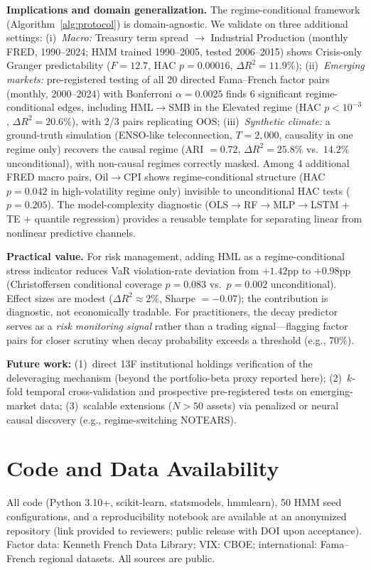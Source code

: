 \documentclass[sigconf,anonymous]{acmart}
\begin{document}
\textbf{Implications and domain generalization.}
The regime-conditional framework (Algorithm~\ref{alg:protocol}) is
domain-agnostic. We validate on three additional settings:
(i)~\emph{Macro:} Treasury term spread $\to$ Industrial Production
(monthly FRED, 1990--2024; HMM trained 1990--2005, tested 2006--2015)
shows Crisis-only Granger predictability
($F = 12.7$, HAC $p = 0.00016$, $\Delta R^2 = 11.9\%$);
(ii)~\emph{Emerging markets:} pre-registered testing of all 20 directed
Fama--French factor pairs (monthly, 2000--2024) with Bonferroni
$\alpha = 0.0025$ finds 6 significant regime-conditional edges, including
HML$\to$SMB in the Elevated regime (HAC $p < 10^{-3}$, $\Delta R^2 = 20.6\%$),
with 2/3 pairs replicating OOS;
(iii)~\emph{Synthetic climate:} a ground-truth simulation (ENSO-like
teleconnection, $T = 2{,}000$, causality in one regime only) recovers
the causal regime (ARI $= 0.72$, $\Delta R^2 = 25.8\%$
vs.\ $14.2\%$ unconditional), with non-causal regimes correctly masked.
Among 4 additional FRED macro pairs, Oil$\to$CPI shows
regime-conditional structure (HAC $p = 0.042$ in high-volatility regime
only) invisible to unconditional HAC tests ($p = 0.205$).
The model-complexity diagnostic
(OLS$\to$RF$\to$MLP$\to$LSTM + TE + quantile regression) provides a
reusable template for separating linear from nonlinear predictive channels.

\textbf{Practical value.}
For risk management, adding HML as a regime-conditional stress indicator
reduces VaR violation-rate deviation from $+1.42$pp to $+0.98$pp
(Christoffersen conditional coverage $p = 0.083$ vs.\ $p = 0.002$ unconditional).
Effect sizes are modest ($\Delta R^2 \approx 2\%$, Sharpe $= -0.07$);
the contribution is diagnostic, not economically tradable.
For practitioners, the decay predictor serves as a \emph{risk monitoring signal}
rather than a trading signal---flagging factor pairs for closer scrutiny
when decay probability exceeds a threshold (e.g., 70\%).

\textbf{Future work:}
(1)~direct 13F institutional holdings verification of the deleveraging
mechanism (beyond the portfolio-beta proxy reported here);
(2)~$k$-fold temporal cross-validation and prospective pre-registered
tests on emerging-market data;
(3)~scalable extensions ($N > 50$ assets) via penalized or neural
causal discovery (e.g., regime-switching NOTEARS).

\section*{Code and Data Availability}
All code (Python 3.10+, scikit-learn, statsmodels, hmmlearn),
50 HMM seed configurations, and a reproducibility notebook are
available at an anonymized repository (link provided to reviewers;
public release with DOI upon acceptance).
Factor data: Kenneth French Data Library; VIX: CBOE;
international: Fama--French regional datasets. All sources are public.


\end{document}
